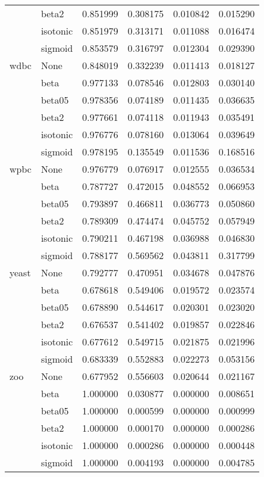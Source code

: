 \begin{tabular}{llrrrr}
        & beta2 &  0.851999 &  0.308175 &  0.010842 &  0.015290 \\
        & isotonic &  0.851979 &  0.313171 &  0.011088 &  0.016474 \\
        & sigmoid &  0.853579 &  0.316797 &  0.012304 &  0.029390 \\
wdbc & None &  0.848019 &  0.332239 &  0.011413 &  0.018127 \\
        & beta &  0.977133 &  0.078546 &  0.012803 &  0.030140 \\
        & beta05 &  0.978356 &  0.074189 &  0.011435 &  0.036635 \\
        & beta2 &  0.977661 &  0.074118 &  0.011943 &  0.035491 \\
        & isotonic &  0.976776 &  0.078160 &  0.013064 &  0.039649 \\
        & sigmoid &  0.978195 &  0.135549 &  0.011536 &  0.168516 \\
wpbc & None &  0.976779 &  0.076917 &  0.012555 &  0.036534 \\
        & beta &  0.787727 &  0.472015 &  0.048552 &  0.066953 \\
        & beta05 &  0.793897 &  0.466811 &  0.036773 &  0.050860 \\
        & beta2 &  0.789309 &  0.474474 &  0.045752 &  0.057949 \\
        & isotonic &  0.790211 &  0.467198 &  0.036988 &  0.046830 \\
        & sigmoid &  0.788177 &  0.569562 &  0.043811 &  0.317799 \\
yeast & None &  0.792777 &  0.470951 &  0.034678 &  0.047876 \\
        & beta &  0.678618 &  0.549406 &  0.019572 &  0.023574 \\
        & beta05 &  0.678890 &  0.544617 &  0.020301 &  0.023020 \\
        & beta2 &  0.676537 &  0.541402 &  0.019857 &  0.022846 \\
        & isotonic &  0.677612 &  0.549715 &  0.021875 &  0.021996 \\
        & sigmoid &  0.683339 &  0.552883 &  0.022273 &  0.053156 \\
zoo & None &  0.677952 &  0.556603 &  0.020644 &  0.021167 \\
        & beta &  1.000000 &  0.030877 &  0.000000 &  0.008651 \\
        & beta05 &  1.000000 &  0.000599 &  0.000000 &  0.000999 \\
        & beta2 &  1.000000 &  0.000170 &  0.000000 &  0.000286 \\
        & isotonic &  1.000000 &  0.000286 &  0.000000 &  0.000448 \\
        & sigmoid &  1.000000 &  0.004193 &  0.000000 &  0.004785 \\
\bottomrule
\end{tabular}
